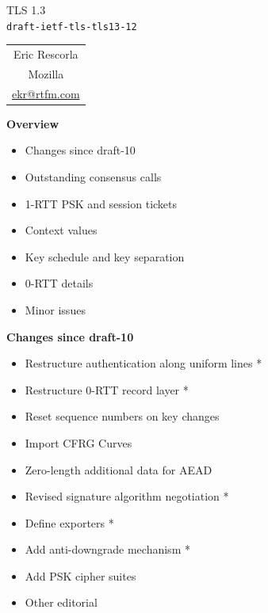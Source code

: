 \documentclass[helvetica]{seminar}
\newcommand{\heading}[1]{%
  \begin{center} 
    \large\bf 
    #1 
  \end{center} 
  \vspace{.4 in}}
\begin{document}
\begin{slide}
\begin{center}
\vspace{.5 in}
\LARGE{{\bf}TLS 1.3\\{\small \verb^draft-ietf-tls-tls13-12^}}\\
\vspace{.2in}
\large{
\begin{tabular}{c}
Eric Rescorla\\
Mozilla\\
\url{ekr@rtfm.com}
\end{tabular}
}
\end{center}

\end{slide}

\centerslidesfalse 


\begin{slide}
\heading{Overview}

\begin{itemize}
\item Changes since draft-10
\item Outstanding consensus calls
\item 1-RTT PSK and session tickets
\item Context values
\item Key schedule and key separation
\item 0-RTT details
\item Minor issues
\end{itemize}
\end{slide}

\begin{slide}
\heading{Changes since draft-10}

\begin{itemize}
\item Restructure authentication along uniform lines *
\item Restructure 0-RTT record layer *
\item Reset sequence numbers on key changes 
\item Import CFRG Curves
\item Zero-length additional data for AEAD
\item Revised signature algorithm negotiation *
\item Define exporters *
\item Add anti-downgrade mechanism *
\item Add PSK cipher suites
\item Other editorial
\end{itemize}
\end{slide}
\end{document}
